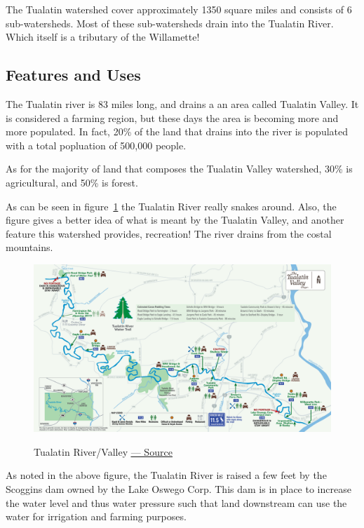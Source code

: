 \documentclass{article}
\begin{document}
The Tualatin watershed cover approximately 1350 square miles and consists of 6 sub-watersheds. Most of these sub-watersheds
drain into the Tualatin River. Which itself is a tributary of the Willamette! 

\subsection{Features and Uses}
The Tualatin river is 83 miles long, and drains a an area called Tualatin Valley. It is considered a farming region, but
these days the area is becoming more and more populated. In fact, 20\% of the land that drains into the river
is populated with a total popluation of 500,000 people. 

As for the majority of land that composes the Tualatin Valley watershed, 30\% is agricultural, and 50\% is forest.

As can be seen in figure~\ref{tualatinValley} the Tualatin River really snakes around. Also, the figure gives a better 
idea of what is meant by the Tualatin Valley, and another feature this watershed provides, recreation! The river drains 
from the costal mountains.

\begin{figure}[H]
\centering{}
\caption{Tualatin River/Valley \href{http://tualatinriverkeepers.org/wp-content/uploads/2016/09/TRKWaterTrailBig2016.png}{\underline{--- Source}}}
\includegraphics[width=\textwidth]{tualatinRiver}\label{tualatinValley}
\end{figure}

As noted in the above figure, the Tualatin River is raised a few feet by the Scoggins dam owned by the Lake Oswego Corp.
This dam is in place to increase the water level and thus water pressure such that land downstream can use the water
for irrigation and farming purposes. 
\end{document}

